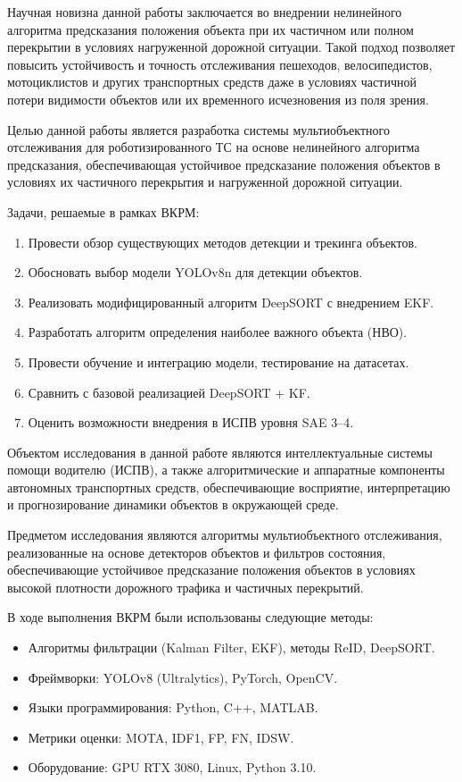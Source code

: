 Научная новизна данной работы заключается во внедрении нелинейного алгоритма предсказания положения объекта при их частичном или полном перекрытии в условиях нагруженной дорожной ситуации. Такой подход позволяет повысить устойчивость и точность отслеживания пешеходов, велосипедистов, мотоциклистов и других транспортных средств даже в условиях частичной потери видимости объектов или их временного исчезновения из поля зрения.

Целью данной работы является разработка системы мультиобъектного отслеживания для роботизированного ТС на основе нелинейного алгоритма предсказания, обеспечивающая устойчивое предсказание положения объектов в условиях их частичного перекрытия и нагруженной дорожной ситуации. 

Задачи, решаемые в рамках ВКРМ:

\begin{enumerate}
    \item Провести обзор существующих методов детекции и трекинга объектов.
    \item Обосновать выбор модели YOLOv8n для детекции объектов.
    \item Реализовать модифицированный алгоритм DeepSORT с внедрением EKF.
    \item Разработать алгоритм определения наиболее важного объекта (НВО).
    \item Провести обучение и интеграцию модели, тестирование на датасетах.
    \item Сравнить с базовой реализацией DeepSORT + KF.
    \item Оценить возможности внедрения в ИСПВ уровня SAE 3–4.
\end{enumerate}

Объектом исследования в данной работе являются интеллектуальные системы помощи водителю (ИСПВ), а также алгоритмические и аппаратные компоненты автономных транспортных средств, обеспечивающие восприятие, интерпретацию и прогнозирование динамики объектов в окружающей среде.

Предметом исследования являются алгоритмы мультиобъектного отслеживания, реализованные на основе детекторов объектов и фильтров состояния, обеспечивающие устойчивое предсказание положения объектов в условиях высокой плотности дорожного трафика и частичных перекрытий.

В ходе выполнения ВКРМ были использованы следующие методы:

\begin{itemize}
    \item Алгоритмы фильтрации (Kalman Filter, EKF), методы ReID, DeepSORT.
    \item Фреймворки: YOLOv8 (Ultralytics), PyTorch, OpenCV.
    \item Языки программирования: Python, C++, MATLAB.
    \item Метрики оценки: MOTA, IDF1, FP, FN, IDSW.
    \item Оборудование: GPU RTX 3080, Linux, Python 3.10.
\end{itemize}

